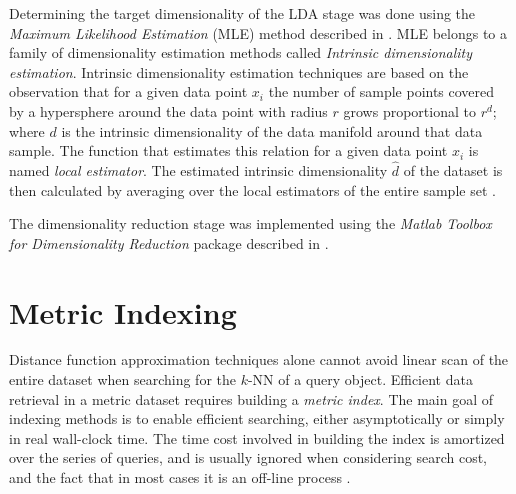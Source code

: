 \iftoggle{edit-mode}{\hspace{0pt}\marginpar{LDA target dimensionality}}{}
Determining the target dimensionality of the LDA stage was done using the \emph{Maximum Likelihood Estimation} (MLE) method described in \cite{levina2004maximum}.
MLE belongs to a family of dimensionality estimation methods called \emph{Intrinsic dimensionality estimation}.
Intrinsic dimensionality estimation techniques are based on the observation that for a given data point $x_i$ the number of sample points covered by a hypersphere around the data point with radius $r$ grows proportional to $r^d$; where $d$ is the intrinsic dimensionality of the data manifold around that data sample.  
The function that estimates this relation for a given data point $x_i$ is named \emph{local estimator}.
The estimated intrinsic dimensionality $\hat{d}$ of the dataset is then calculated by averaging over the local estimators of the entire sample set \cite{van2007introduction}.

\iftoggle{edit-mode}{\hspace{0pt}\marginpar{The DR package}}{}
The dimensionality reduction stage was implemented using the \emph{Matlab Toolbox for Dimensionality Reduction} package described in \cite{van2007introduction}.

\newpage{}


\section{Metric Indexing}
\label{sec:metric_indexing}

\iftoggle{edit-mode}{\hspace{0pt}\marginpar{Motivation}}{}
Distance function approximation techniques alone cannot avoid linear scan of the entire dataset when searching for the $k$-NN of a query object. 
Efficient data retrieval in a metric dataset requires building a \emph{metric index}.
The main goal of indexing methods is to enable efficient searching, either asymptotically or simply in real wall-clock time. 
The time cost involved in building the index is amortized over the series of queries, and is usually ignored when considering search cost, and the fact that in most cases it is an off-line process \cite{hetland2009basic}.

